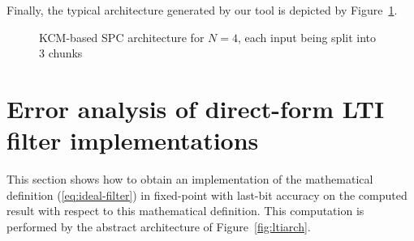\documentclass[twocolumn]{IEEEtran}
\begin{document}
Finally, the typical architecture generated by our tool is depicted by Figure~\ref{fig:Overall architecture}.

\begin{figure}
  \begin{center}
\end{center}
\caption{KCM-based SPC architecture for $N=4$, each input being split into 3 chunks  \label{fig:Overall architecture}}
\end{figure}





\section{Error analysis of direct-form  LTI filter implementations \label{sec:erroranalysisLTI}}
This section shows how to obtain an implementation of the mathematical definition (\ref{eq:ideal-filter}) in fixed-point with last-bit accuracy on the computed result with respect to this  mathematical definition.
This computation is performed by the abstract architecture of Figure~\ref{fig:ltiarch}.
\end{document}

